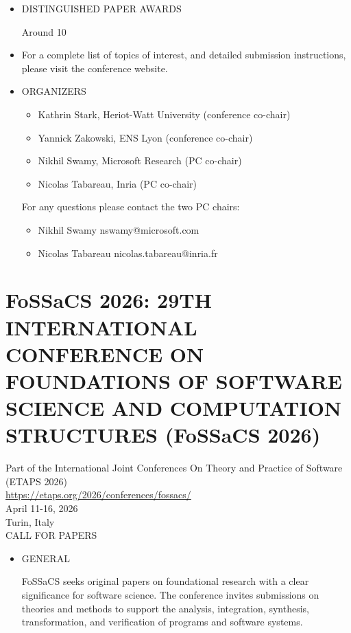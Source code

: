 \documentclass[prodmode,acmtecs]{acmsmall} %
\begin{document}
{\begin{itemize}
\item  DISTINGUISHED PAPER AWARDS 
 
  Around 10%
 
\item  For a complete list of topics of interest, and detailed submission instructions, please visit the conference website.  
 
\item  ORGANIZERS 
 
\begin{itemize}\item  Kathrin Stark, Heriot-Watt University (conference co-chair)
\item  Yannick Zakowski, ENS Lyon (conference co-chair)
\item  Nikhil Swamy, Microsoft Research (PC co-chair)
\item  Nicolas Tabareau, Inria (PC co-chair)
\end{itemize} 
  For any questions please contact the two PC chairs: 
 
\begin{itemize}\item  Nikhil Swamy nswamy@microsoft.com
\item  Nicolas Tabareau nicolas.tabareau@inria.fr
\end{itemize} 
\end{itemize}\section{FoSSaCS 2026: 29TH INTERNATIONAL CONFERENCE ON FOUNDATIONS OF SOFTWARE SCIENCE AND COMPUTATION STRUCTURES (FoSSaCS 2026)}\label{FoSSaCS2026}  Part of the International Joint Conferences On Theory and Practice of  Software (ETAPS 2026)\\ 
  \href{https://etaps.org/2026/conferences/fossacs/}{https://etaps.org/2026/conferences/fossacs/}\\ 
  April 11-16, 2026\\ 
  Turin, Italy\\ 
CALL FOR PAPERS 

\begin{itemize}\item  GENERAL 
 
  FoSSaCS seeks original papers on foundational research with a clear significance for software science. The conference invites submissions on theories and methods to support the analysis, integration, synthesis, transformation, and verification of programs and software systems. 
 

\end{itemize}}
\end{document}
